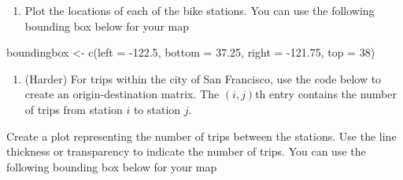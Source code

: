 \documentclass[
]{book}
\newenvironment{Shaded}{\begin{snugshade}}{\end{snugshade}}
\newcommand{\AttributeTok}[1]{\textcolor[rgb]{0.77,0.63,0.00}{#1}}
\newcommand{\DecValTok}[1]{\textcolor[rgb]{0.00,0.00,0.81}{#1}}
\newcommand{\FloatTok}[1]{\textcolor[rgb]{0.00,0.00,0.81}{#1}}
\newcommand{\FunctionTok}[1]{\textcolor[rgb]{0.00,0.00,0.00}{#1}}
\newcommand{\NormalTok}[1]{#1}
\newcommand{\OtherTok}[1]{\textcolor[rgb]{0.56,0.35,0.01}{#1}}
\newcommand{\SpecialCharTok}[1]{\textcolor[rgb]{0.00,0.00,0.00}{#1}}
\newcommand{\StringTok}[1]{\textcolor[rgb]{0.31,0.60,0.02}{#1}}
\providecommand{\tightlist}{%
  \setlength{\itemsep}{0pt}\setlength{\parskip}{0pt}}
\begin{document}
\begin{enumerate}
\def\labelenumi{\alph{enumi})}
\tightlist
\item
  Plot the locations of each of the bike stations. You can use the following bounding box below for your map
\end{enumerate}

\begin{Shaded}
\begin{Highlighting}[]
\NormalTok{boundingbox }\OtherTok{\textless{}{-}} \FunctionTok{c}\NormalTok{(}\AttributeTok{left =} \SpecialCharTok{{-}}\FloatTok{122.5}\NormalTok{, }\AttributeTok{bottom =} \FloatTok{37.25}\NormalTok{, }\AttributeTok{right =} \SpecialCharTok{{-}}\FloatTok{121.75}\NormalTok{, }\AttributeTok{top =} \DecValTok{38}\NormalTok{)}
\end{Highlighting}
\end{Shaded}

\begin{enumerate}
\def\labelenumi{\alph{enumi})}
\setcounter{enumi}{1}
\tightlist
\item
  (Harder) For trips within the city of San Francisco, use the code below to create an origin-destination matrix. The \((i,j)\)th entry contains the number of trips from station \(i\) to station \(j\).
\end{enumerate}

Create a plot representing the number of trips between the stations. Use the line thickness or transparency to indicate the number of trips. You can use the following bounding box below for your map

\begin{Shaded}
\end{Shaded}
\end{document}
